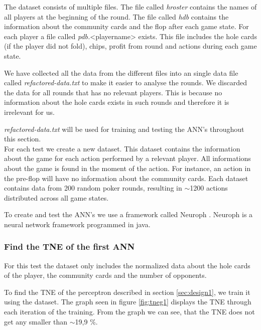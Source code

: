 The dataset consists of multiple files. The file called \textit{hroster} contains the names of all players at the beginning of the round. The file called \textit{hdb} contains the information about the community cards and the flop after each game state. For each player a file called \textit{pdb.}<playername> exists. This file includes the hole cards (if the player did not fold), chips, profit from round and actions during each game state. 

We have collected all the data from the different files into an single data file called \textit{refactored-data.txt} to make it easier to analyse the rounds. We discarded the data for all rounds that has no relevant players. This is because no information about the hole cards exists in such rounds and therefore it is irrelevant for us. 

\textit{refactored-data.txt} will be used for training and testing the ANN's throughout this section.\\

For each test we create a new dataset. This dataset contains the information about the game for each action performed by a relevant player. All informations about the game is found in the moment of the action. For instance, an action in the pre-flop will have no information about the community cards.
Each dataset contains data from 200 random poker rounds, resulting in $\sim$1200 actions distributed across all game states.

To create and test the ANN's we use a framework called Neuroph \cite{neuroph}. Neuroph is a neural network framework programmed in java. 

\subsubsection{Find the TNE of the first ANN}
\label{sec:ann-test1}
For this test the dataset only includes the normalized data about the hole cards of the player, the community cards and the number of opponents.

To find the TNE of the perceptron described in section \ref{sec:design1}, we train it using the dataset. The graph seen in figure \ref{fig:tneg1} displays the TNE through each iteration of the training. From the graph we can see, that the TNE does not get any smaller than $\sim$19,9 \%.

